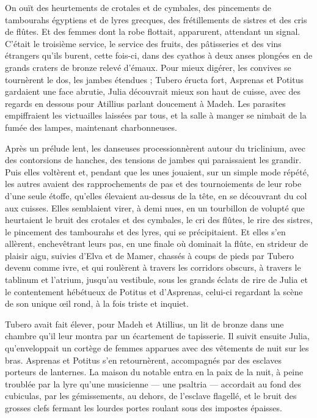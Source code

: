 \documentclass[a4paper, 11pt, oneside, polutonikogreek, french]{article}
\begin{document}
On ouït des heurtements de crotales et de cymbales, des pincements de tambourahs égyptiens et de lyres grecques, des frétillements de sistres et des cris de flûtes. Et des femmes dont la robe flottait, apparurent, attendant un signal. C'était le troisième service, le service des fruits, des pâtisseries et des vins étrangers qu'ils burent, cette fois-ci, dans des cyathos à deux anses plongées en de grands craters de bronze relevé d'émaux. Pour mieux digérer, les convives se tournèrent le dos, les jambes étendues ; Tubero éructa fort, Asprenas et Potitus gardaient une face abrutie, Julia découvrait mieux son haut de cuisse, avec des regards en dessous pour Atillius parlant doucement à Madeh. Les parasites empiffraient les victuailles laissées par tous, et la salle à manger se nimbait de la fumée des lampes, maintenant charbonneuses.

Après un prélude lent, les danseuses processionnèrent autour du triclinium, avec des contorsions de hanches, des tensions de jambes qui paraissaient les grandir. Puis elles voltèrent et, pendant que les unes jouaient, sur un simple mode répété, les autres avaient des rapprochements de pas et des tournoiements de leur robe d'une seule étoffe, qu'elles élevaient au-dessus de la tête, en se découvrant du col aux cuisses. Elles semblaient virer, à demi nues, en un tourbillon de volupté que heurtaient le bruit des crotales et des cymbales, le cri des flûtes, le rire des sistres, le pincement des tambourahs et des lyres, qui se précipitaient. Et elles s'en allèrent, enchevêtrant leurs pas, en une finale où dominait la flûte, en strideur de plaisir aigu, suivies d'Elva et de Mamer, chassés à coups de pieds par Tubero devenu comme ivre, et qui roulèrent à travers les corridors obscurs, à travers le tablinum et l'atrium, jusqu'au vestibule, sous les grands éclats de rire de Julia et le contentement hébétueux de Potitus et d'Asprenas, celui-ci regardant la scène de son unique œil rond, à la fois triste et inquiet.

Tubero avait fait élever, pour Madeh et Atillius, un lit de bronze dans une chambre qu'il leur montra par un écartement de tapisserie. Il suivit ensuite Julia, qu'enveloppait un cortège de femmes apparues avec des vêtements de nuit sur les bras. Asprenas et Potitus s'en retournèrent, accompagnés par des esclaves porteurs de lanternes. La maison du notable entra en la paix de la nuit, à peine troublée par la lyre qu'une musicienne --- une psaltria --- accordait au fond des cubiculas, par les gémissements, au dehors, de l'esclave flagellé, et le bruit des grosses clefs fermant les lourdes portes roulant sous des impostes épaisses.
\clearpage
\end{document}
